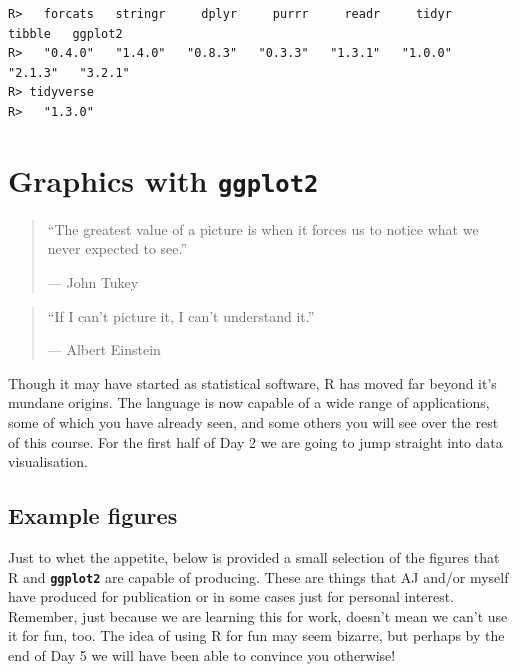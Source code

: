 \documentclass[
]{book}
\newenvironment{Shaded}{\begin{snugshade}}{\end{snugshade}}
\newcommand{\KeywordTok}[1]{\textcolor[rgb]{0.13,0.29,0.53}{\textbf{#1}}}
\newcommand{\NormalTok}[1]{#1}
\newcommand{\OperatorTok}[1]{\textcolor[rgb]{0.81,0.36,0.00}{\textbf{#1}}}
\newcommand{\StringTok}[1]{\textcolor[rgb]{0.31,0.60,0.02}{#1}}
\begin{document}
\begin{Shaded}
\end{Shaded}

\begin{verbatim}
R>   forcats   stringr     dplyr     purrr     readr     tidyr    tibble   ggplot2 
R>   "0.4.0"   "1.4.0"   "0.8.3"   "0.3.3"   "1.3.1"   "1.0.0"   "2.1.3"   "3.2.1" 
R> tidyverse 
R>   "1.3.0"
\end{verbatim}

\hypertarget{graphics}{%
\chapter{\texorpdfstring{Graphics with \textbf{\texttt{ggplot2}}}{Graphics with ggplot2}}\label{graphics}}

\begin{quote}
``The greatest value of a picture is when it forces us to notice what we never expected to see.''

--- John Tukey
\end{quote}

\begin{quote}
``If I can't picture it, I can't understand it.''

--- Albert Einstein
\end{quote}

Though it may have started as statistical software, R has moved far beyond it's mundane origins. The language is now capable of a wide range of applications, some of which you have already seen, and some others you will see over the rest of this course. For the first half of Day 2 we are going to jump straight into data visualisation.

\hypertarget{example-figures}{%
\section{Example figures}\label{example-figures}}

Just to whet the appetite, below is provided a small selection of the figures that R and \textbf{\texttt{ggplot2}} are capable of producing. These are things that AJ and/or myself have produced for publication or in some cases just for personal interest. Remember, just because we are learning this for work, doesn't mean we can't use it for fun, too. The idea of using R for fun may seem bizarre, but perhaps by the end of Day 5 we will have been able to convince you otherwise!
\end{document}
